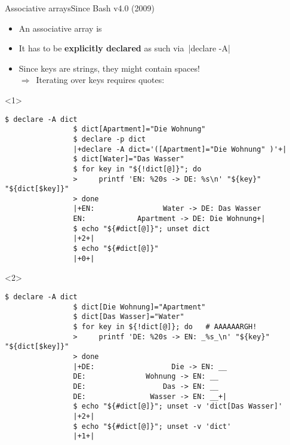 \begin{frame}[fragile]{Associative arrays}{Since Bash v4.0 (2009)}
    \vspace{-2mm}
    \begin{overlayarea}{\textwidth}{0.7\textheight}
        \begin{itemize}
            \item An associative array is 
            \item It has to be \textbf{explicitly declared} as such via \,\bash|declare -A|
            \item Since keys are strings, they might contain spaces!\\
                  $\Rightarrow\,$ Iterating over keys requires quotes: 
        \end{itemize}
        \begin{onlyenv}<1>
            \begin{lstlisting}[style=MyBash, xrightmargin=1mm]
                $ declare -A dict
                $ dict[Apartment]="Die Wohnung"
                $ declare -p dict
                |+declare -A dict='([Apartment]="Die Wohnung" )'+|
                $ dict[Water]="Das Wasser"
                $ for key in "${!dict[@]}"; do
                >     printf 'EN: %20s -> DE: %s\n' "${key}" "${dict[$key]}"
                > done
                |+EN:                Water -> DE: Das Wasser
                EN:            Apartment -> DE: Die Wohnung+|
                $ echo "${#dict[@]}"; unset dict
                |+2+|
                $ echo "${#dict[@]}"
                |+0+|
            \end{lstlisting}
        \end{onlyenv}
        \begin{onlyenv}<2>
            \begin{lstlisting}[style=MyBash, firstnumber=15, xrightmargin=1mm]
                $ declare -A dict
                $ dict[Die Wohnung]="Apartment"
                $ dict[Das Wasser]="Water"
                $ for key in ${!dict[@]}; do   # AAAAAARGH!
                >     printf 'DE: %20s -> EN: _%s_\n' "${key}" "${dict[$key]}"
                > done
                |+DE:                  Die -> EN: __
                DE:              Wohnung -> EN: __
                DE:                  Das -> EN: __
                DE:               Wasser -> EN: __+|
                $ echo "${#dict[@]}"; unset -v 'dict[Das Wasser]'
                |+2+|
                $ echo "${#dict[@]}"; unset -v 'dict'
                |+1+|
            \end{lstlisting}
        \end{onlyenv}
    \end{overlayarea}
\end{frame}

